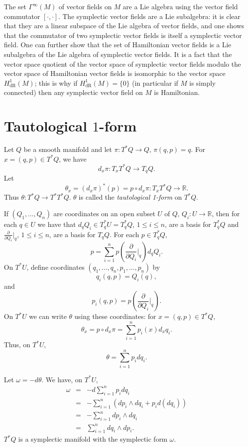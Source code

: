 \documentclass{article}
\begin{document}
The set $\Gamma^\infty(M)$ of vector fields on $M$ are a Lie algebra using the vector field commutator $[\cdot,\cdot]$. The symplectic vector fields
are a Lie subalgebra: it is clear that they are a linear subspace of the Lie algebra of vector fields, and one shows that the commutator
of two symplectic vector fields is itself a symplectic vector field. One can further show that the set of Hamiltonian vector fields is a Lie subalgebra
of the Lie algebra of symplectic vector fields. It is a fact that the vector space quotient of the vector space of symplectic vector fields modulo the vector space
of Hamiltonian vector
fields is isomorphic to the vector space $H_{\textrm{dR}}^1(M)$; this is why if $H_{\textrm{dR}}^1(M)=\{0\}$ (in particular if $M$ is simply connected) then any symplectic vector field on $M$ is Hamiltonian.

\section{Tautological $1$-form}
Let $Q$ be a smooth manifold and let $\pi:T^*Q \to Q$, $\pi(q,p)=q$. For $x=(q,p) \in T^*Q$, we have
\[
d_x \pi: T_x T^* Q \to T_q Q.
\]
Let
\[
\theta_x = (d_x \pi)^* (p)=p \circ d_x \pi: T_x T^* Q  \to \mathbb{R}.
\]
Thus $\theta: T^*Q \to T^*T^*Q$.  $\theta$ is called the {\em tautological 1-form} on $T^*Q$. 

If $(Q_1,\ldots,Q_n)$ are coordinates on an open subset $U$ of $Q$, $Q_i:U \to \mathbb{R}$, then for each $q \in U$ we
have that $d_q Q_i \in T_q^*U=T_q^* Q$, $1 \leq i \leq n$, are a basis for $T_q^* Q$ and $\frac{\partial}{\partial Q_i}\big|_q$, $1 \leq i \leq n$, are a basis for $T_qQ$. For each $p \in T_q^* Q$,
\[
p=\sum_{i=1}^n p\left(\frac{\partial}{\partial Q_i}\Big|_q \right) d_q Q_i.
\] 
On $T^*U$, define coordinates $(q_1,\ldots,q_n,p_1,\ldots,p_n)$ by 
\[
q_i(q,p)=Q_i(q),
\]
and
\[
p_i(q,p)=p\left(\frac{\partial}{\partial Q_i}\Big|_q \right).
\]
On $T^*U$ we can
write $\theta$ using these coordinates: for $x=(q,p) \in T^*Q$,
\[
\theta_x = p \circ d_x \pi = \sum_{i=1}^n p_i(x) d_x q_i.
\]
Thus, on $T^*U$,
\[
\theta=\sum_{i=1}^n p_i dq_i.
\]

Let $\omega=-d\theta$. We have, on $T^*U$,
\begin{eqnarray*}
\omega&=&-d \sum_{i=1}^n p_i dq_i\\
&=&-\sum_{i=1}^n \left(dp_i \wedge dq_i +  p_i d(dq_i) \right)\\
&=&-\sum_{i=1}^n dp_i \wedge dq_i\\
&=&\sum_{i=1}^n dq_i \wedge dp_i.
\end{eqnarray*}
$T^*Q$ is a symplectic manifold with the symplectic form $\omega$.
\end{document}
